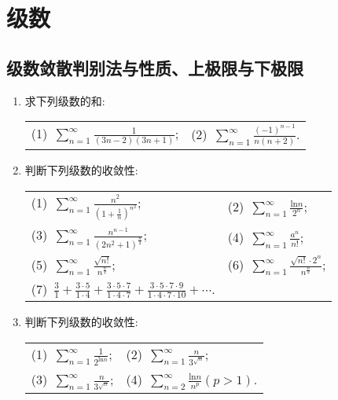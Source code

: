 \chapter{级数}
\section{级数敛散判别法与性质、上极限与下极限}
\begin{enumerate}
\item 求下列级数的和:
\begin{table}[H]
	\begin{tabular}{ll}
		(1)\ $\sum\limits_{n=1}^{\infty}\frac{1}{(3n-2)(3n+1)}$;\qquad \qquad \qquad\qquad	\qquad&(2)\ $\sum\limits_{n=1}^{\infty}\frac{(-1)^{n-1}}{n(n+2)}$.\\
	\end{tabular}
\end{table}
\item 判断下列级数的收敛性:
\begin{table}[H]
	\begin{tabular}{ll}
		(1)\ $\sum\limits_{n=1}^{\infty}\frac{n^2}{(1+\frac{1}{n})^{n^2}}$;\qquad \qquad \qquad \qquad \qquad&(2)\ $\sum\limits_{n=1}^{\infty}\frac{\mathrm{ln}n}{2^n}$;\\
		(3)\ $\sum\limits_{n=1}^{\infty}\frac{n^{n-1}}{(2n^2+1)^\frac{n}{2}}$;\qquad \qquad \qquad\qquad	\qquad&(4)\ $\sum\limits_{n=1}^{\infty}\frac{a^n}{n!}$;\\
		(5)\ $\sum\limits_{n=1}^{\infty}\frac{\sqrt{n!}}{n^\frac{n}{2}}$;\qquad \qquad \qquad\qquad	\qquad&(6)\ $\sum\limits_{n=1}^{\infty}\frac{\sqrt{n!}\cdot 2^n}{n^\frac{n}{2}}$;\\
	(7)\ $\frac{3}{1}+\frac{3\cdot5}{1\cdot 4}+\frac{3\cdot5\cdot 7}{1\cdot 4\cdot 7}+\frac{3\cdot5\cdot7\cdot9}{1\cdot 4\cdot7\cdot 10}+\cdots$.
	\end{tabular}
\end{table}
\item 判断下列级数的收敛性:
\begin{table}[H]
	\begin{tabular}{ll}
		(1)\ $\sum\limits_{n=1}^{\infty}\frac{1}{2^{\mathrm{ln}n}}$;\qquad \qquad \qquad\qquad	\qquad&(2)\ $\sum\limits_{n=1}^{\infty}\frac{n}{3^{\sqrt{n}}}$;\\
		(3)\ $\sum\limits_{n=1}^{\infty}\frac{n}{3^{\sqrt{n}}}$;\qquad \qquad \qquad\qquad	\qquad&(4)\ $\sum\limits_{n=2}^{\infty}\frac{\mathrm{ln}n}{n^p}(p>1)$.
\end{tabular}
\end{table}

\end{enumerate}

